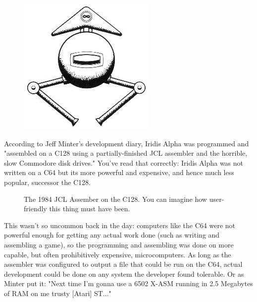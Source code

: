\begin{definition}
\setlength{\intextsep}{0pt}%
\setlength{\columnsep}{3pt}%
\begin{figure}
\includegraphics[width=\linewidth]{src/callout/ia.jpg} 
\end{figure}
\small

According to Jeff Minter's development diary, Iridis Alpha was programmed and "assembled
on a C128 using a partially-finished JCL assembler and the horrible, slow
Commodore disk drives." 
You've read that correctly: Iridis Alpha was not written
on a C64 but its more powerful and expensive, and hence much less popular, successor
the C128. 

\begin{figure}[H]
  {
    \begin{adjustbox}{width=7cm,center}
    \end{adjustbox}
  }\caption[]{The 1984 JCL Assember on the C128. You can imagine how user-friendly this thing must have been.}
\end{figure}
This wasn't so uncommon back in the day: computers like the C64 were not
powerful enough for getting any actual work done (such as writing and assembling a game),
so the programming and assembling was done on more capable, but often prohibitively expensive,
microcomputers. As long as the assembler was configured to output a file that could be run on
the C64, actual development could be done on any system the developer found tolerable. Or as
  Minter put it: "Next time I'm gonna use a 6502 X-ASM running in 2.5 Megabytes of RAM on 
  me trusty [Atari] ST..."
\end{definition}

